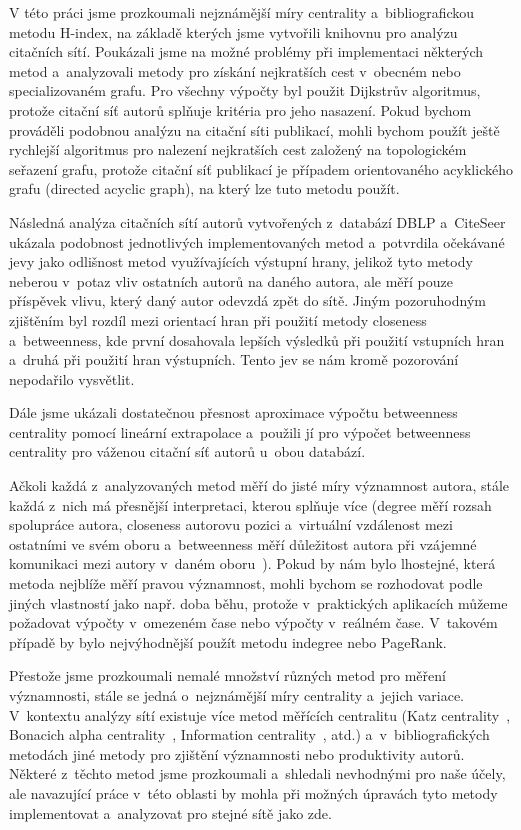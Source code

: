 \documentclass{bakalarka}
\begin{document}
V této práci jsme prozkoumali nejznámější míry centrality a~bibliografickou
metodu H-index, na základě kterých jsme vytvořili knihovnu pro analýzu
citačních sítí. Poukázali jsme na možné problémy při implementaci některých
metod a~analyzovali metody pro získání nejkratších cest v~obecném nebo
specializovaném grafu. Pro všechny výpočty byl použit Dijkstrův algoritmus,
protože citační síť autorů splňuje kritéria pro jeho nasazení. Pokud bychom
prováděli podobnou analýzu na citační síti publikací, mohli bychom použít ještě
rychlejší algoritmus pro nalezení nejkratších cest založený na topologickém
seřazení grafu, protože citační síť publikací je případem orientovaného
acyklického grafu (directed acyclic graph), na který lze tuto metodu použít. 

Následná analýza citačních sítí autorů vytvořených z~databází DBLP a~CiteSeer
ukázala podobnost jednotlivých implementovaných metod a~potvrdila očekávané
jevy jako odlišnost metod využívajících výstupní hrany, jelikož tyto metody
neberou v~potaz vliv ostatních autorů na daného autora, ale měří pouze
příspěvek vlivu, který daný autor odevzdá zpět do sítě. Jiným pozoruhodným
zjištěním byl rozdíl mezi orientací hran při použití metody closeness a~betweenness, kde první dosahovala lepších výsledků při použití vstupních hran a~druhá při použití hran výstupních. Tento jev se nám kromě pozorování nepodařilo
vysvětlit.

Dále jsme ukázali dostatečnou přesnost aproximace výpočtu betweenness
centrality pomocí lineární extrapolace a~použili jí pro výpočet betweenness
centrality pro váženou citační síť autorů u~obou databází.

Ačkoli každá z~analyzovaných metod měří do jisté míry významnost autora, stále
každá z~nich má přesnější interpretaci, kterou splňuje více (degree měří rozsah
spolupráce autora, closeness autorovu pozici a~virtuální vzdálenost mezi
ostatními ve svém oboru a~betweenness měří důležitost autora při vzájemné
komunikaci mezi autory v~daném oboru~\citep{yanding2009}). Pokud by nám bylo
lhostejné, která metoda nejblíže měří pravou významnost, mohli bychom se
rozhodovat podle jiných vlastností jako např. doba běhu, protože v~praktických
aplikacích můžeme požadovat výpočty v~omezeném čase nebo výpočty v~reálném
čase. V~takovém případě by bylo nejvýhodnější použít metodu indegree nebo
PageRank.

Přestože jsme prozkoumali nemalé množství různých metod pro měření významnosti,
stále se jedná o~nejznámější míry centrality a~jejich variace. V~kontextu
analýzy sítí existuje více metod měřících centralitu (Katz
centrality~\citep{katz1953}, Bonacich alpha
centrality~\citep{bonacichlloyd2001}, Information
centrality~\citep{stephensonzelen1989}, atd.) a~v~bibliografických metodách
jiné metody pro zjištění významnosti nebo produktivity autorů. Některé z~těchto
metod jsme prozkoumali a~shledali nevhodnými pro naše účely, ale navazující
práce v~této oblasti by mohla při možných úpravách tyto metody implementovat
a~analyzovat pro stejné sítě jako zde.
\end{document}
